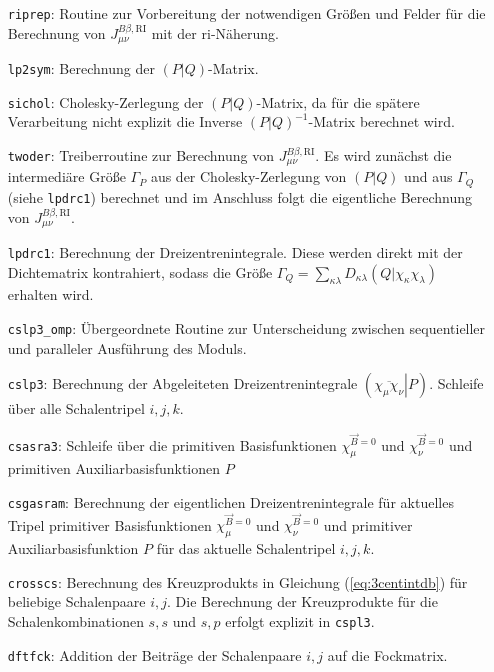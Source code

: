 	\begin{itemize}[leftmargin=65pt]
	    \item[\texttt{riprep}:] Routine zur Vorbereitung der notwendigen Größen und Felder für die Berechnung von $J_{\mu\nu}^{B\beta ,\textrm{RI}}$ mit der \ac{ri}-Näherung. 
	    \item[\texttt{lp2sym}:] Berechnung der $\left(P\vert Q\right)$-Matrix.
	    \item[\texttt{sichol}:] Cholesky-Zerlegung der $\left(P\vert Q\right)$-Matrix, da für die spätere Verarbeitung nicht explizit die Inverse $\left(P\vert Q\right)^{-1}$-Matrix berechnet wird.
	    \item[\texttt{twoder}:] Treiberroutine zur Berechnung von $J_{\mu\nu}^{B\beta ,\textrm{RI}}$. Es wird zunächst die intermediäre Größe $\Gamma_P$ aus der Cholesky-Zerlegung von $\left(P\vert Q\right)$ und aus $\Gamma_Q$ (siehe \texttt{lpdrc1}) berechnet und im Anschluss folgt die eigentliche Berechnung von $J_{\mu\nu}^{B\beta ,\textrm{RI}}$.
	    \item[\texttt{lpdrc1}:] Berechnung der Dreizentrenintegrale. Diese werden direkt mit der Dichtematrix kontrahiert, sodass die Größe $\Gamma_Q=\sum_{\kappa\lambda}D_{\kappa\lambda}\left(Q\vert\chi_\kappa\chi_\lambda\right)$ erhalten wird.
	    \item[\texttt{cslp3\_omp}:] Übergeordnete Routine zur Unterscheidung zwischen sequentieller und paralleler Ausführung des Moduls.
	    \item[\texttt{cslp3}:] Berechnung der Abgeleiteten Dreizentrenintegrale $\left(\left.\overline{\chi_\mu\chi_\nu}\right\vert P\right)$. Schleife über alle Schalentripel $i,j,k$.
	    \item[\texttt{csasra3}:] Schleife über die primitiven Basisfunktionen $\chi_\mu^{\vec{B}=0}$ und $\chi_\nu^{\vec{B}=0}$ und primitiven Auxiliarbasisfunktionen $P$
	    \item[\texttt{csgasram}:] Berechnung der eigentlichen Dreizentrenintegrale für aktuelles Tripel primitiver Basisfunktionen $\chi_\mu^{\vec{B}=0}$ und $\chi_\nu^{\vec{B}=0}$ und primitiver Auxiliarbasisfunktion $P$ für das aktuelle Schalentripel $i,j,k$.
	    \item[\texttt{crosscs}:] Berechnung des Kreuzprodukts in Gleichung (\ref{eq:3centintdb}) für beliebige Schalenpaare $i,j$. Die Berechnung der Kreuzprodukte für die Schalenkombinationen $s,s$ und $s,p$ erfolgt explizit in \texttt{cspl3}.
	    \item[\texttt{dftfck}:] Addition der Beiträge der Schalenpaare $i,j$ auf die Fockmatrix.
	\end{itemize}
	
